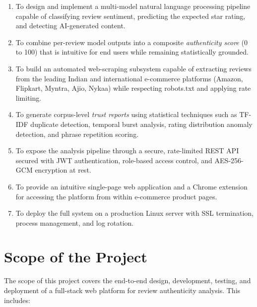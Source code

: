 \documentclass[12pt,a4paper,oneside]{report}
\renewcommand{\texttt}[1]{%
  {\ttfamily\hyphenchar\font=45\relax #1}}
\begin{document}
\begin{enumerate}[leftmargin=*]
  \item To design and implement a multi-model natural language processing
        pipeline capable of classifying review sentiment, predicting the
        expected star rating, and detecting AI-generated content.
  \item To combine per-review model outputs into a composite
        \textit{authenticity score} (0 to 100) that is intuitive for end
        users while remaining statistically grounded.
  \item To build an automated web-scraping subsystem capable of extracting
        reviews from the leading Indian and international e-commerce
        platforms (Amazon, Flipkart, Myntra, Ajio, Nykaa) while respecting
        \texttt{robots.txt} and applying rate limiting.
  \item To generate corpus-level \textit{trust reports} using statistical
        techniques such as TF-IDF duplicate detection, temporal burst
        analysis, rating distribution anomaly detection, and phrase
        repetition scoring.
  \item To expose the analysis pipeline through a secure, rate-limited
        REST API secured with JWT authentication, role-based access
        control, and AES-256-GCM encryption at rest.
  \item To provide an intuitive single-page web application and a Chrome
        extension for accessing the platform from within e-commerce
        product pages.
  \item To deploy the full system on a production Linux server with
        SSL termination, process management, and log rotation.
\end{enumerate}

\section{Scope of the Project}
The scope of this project covers the end-to-end design, development,
testing, and deployment of a full-stack web platform for review
authenticity analysis. This includes:
\end{document}

